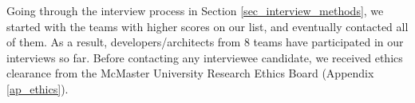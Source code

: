 Going through the interview process in Section \ref{sec_interview_methods}, we started with the teams with higher scores on our list, and eventually contacted all of them. As a result, developers/architects from 8 teams have participated in our interviews so far. Before contacting any interviewee candidate, we received ethics clearance from the McMaster University Research Ethics Board (Appendix \ref{ap_ethics}).
